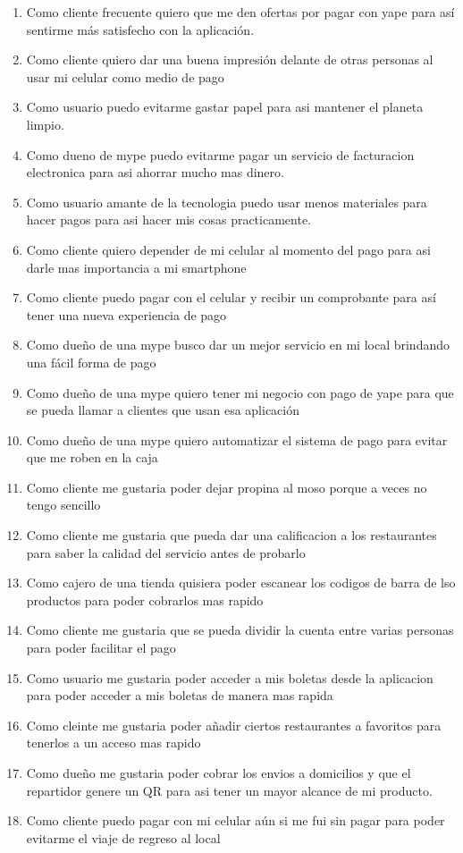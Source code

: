 \documentclass{article}
\begin{document}
\begin{enumerate}
   \item Como cliente frecuente quiero que me den ofertas por pagar con yape para así sentirme más satisfecho con la aplicación.
    \item Como cliente quiero dar una buena impresión delante de otras personas al usar mi celular como medio de pago
    \item Como usuario puedo evitarme gastar papel para asi mantener el planeta limpio.
    \item Como dueno de mype puedo evitarme pagar un servicio de facturacion electronica para asi ahorrar mucho mas dinero.
    \item Como usuario amante de la tecnologia puedo usar menos materiales para hacer pagos para asi hacer mis cosas practicamente.
    \item Como cliente quiero depender de mi celular al momento del pago para asi darle mas importancia a mi smartphone
    \item Como cliente puedo pagar con el celular y recibir un comprobante para así tener una nueva experiencia de pago
    \item Como dueño de una mype busco dar un mejor servicio en mi local brindando una fácil forma de pago
    \item Como dueño de una mype quiero tener mi negocio con pago de yape para que se pueda llamar a clientes que usan esa aplicación
    \item Como dueño de una mype quiero automatizar el sistema de pago para evitar que me roben en la caja
    \item Como cliente me gustaria poder dejar propina al moso porque a veces no tengo sencillo
    \item Como cliente me gustaria que pueda dar una calificacion a los restaurantes para saber la calidad del servicio antes de probarlo
    \item Como cajero de una tienda quisiera poder escanear los codigos de barra de lso productos para poder cobrarlos mas rapido
    \item Como cliente me gustaria que se pueda dividir la cuenta entre varias personas para poder facilitar el pago
    \item Como usuario me gustaria poder acceder a mis boletas desde la aplicacion para poder acceder a mis boletas de manera mas rapida
    \item Como cleinte me gustaria poder añadir ciertos restaurantes a favoritos para tenerlos a un acceso mas rapido
    \item Como dueño me gustaria poder cobrar los envios a domicilios y que el repartidor genere un QR para asi tener un mayor alcance de mi producto.
    \item Como cliente puedo pagar con mi celular aún si me fui sin pagar para poder evitarme el viaje de regreso al local
    
    
\end{enumerate}
\end{document}
